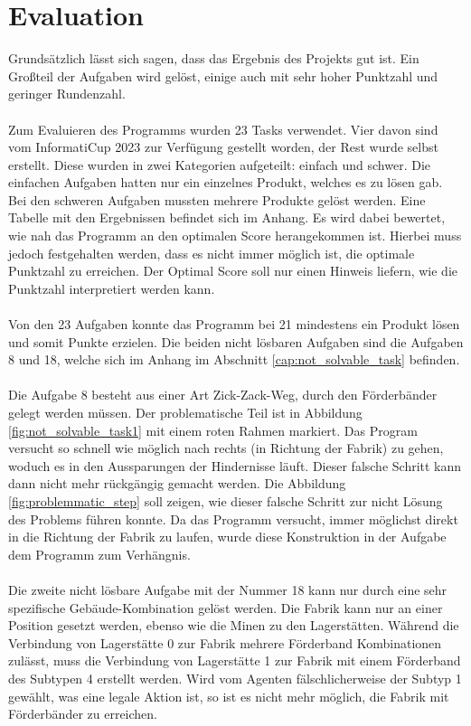 \section{Evaluation}\label{cap:evaluation}
Grundsätzlich lässt sich sagen, dass das Ergebnis des Projekts gut ist. Ein Großteil der Aufgaben wird gelöst, einige auch mit sehr hoher Punktzahl und geringer Rundenzahl.
\\\\
Zum Evaluieren des Programms wurden 23 Tasks verwendet. Vier davon sind vom InformatiCup 2023 zur Verfügung gestellt worden, der Rest wurde selbst erstellt. Diese wurden in zwei Kategorien aufgeteilt: einfach und schwer. Die einfachen Aufgaben hatten nur ein einzelnes Produkt, welches es zu lösen gab. Bei den schweren Aufgaben mussten mehrere Produkte gelöst werden. Eine Tabelle mit den Ergebnissen befindet sich im Anhang. Es wird dabei bewertet, wie nah das Programm an den optimalen Score herangekommen ist. Hierbei muss jedoch festgehalten werden, dass es nicht immer möglich ist, die optimale Punktzahl zu erreichen. Der Optimal Score soll nur einen Hinweis liefern, wie die Punktzahl interpretiert werden kann. 
\\\\
Von den 23 Aufgaben konnte das Programm bei 21 mindestens ein Produkt lösen und somit Punkte erzielen. Die beiden nicht lösbaren Aufgaben sind die Aufgaben 8 und 18, welche sich im Anhang im Abschnitt \ref{cap:not_solvable_task} befinden.
\\\\
Die Aufgabe 8 besteht aus einer Art Zick-Zack-Weg, durch den Förderbänder gelegt werden müssen. Der problematische Teil ist in Abbildung \ref{fig:not_solvable_task1} mit einem roten Rahmen markiert. Das Program versucht so schnell wie möglich nach rechts (in Richtung der Fabrik) zu gehen, woduch es in den Aussparungen der Hindernisse läuft. Dieser falsche Schritt kann dann nicht mehr rückgängig gemacht werden. Die Abbildung \ref{fig:problemmatic_step} soll zeigen, wie dieser falsche Schritt zur nicht Lösung des Problems führen konnte.
Da das Programm versucht, immer möglichst direkt in die Richtung der Fabrik zu laufen, wurde diese Konstruktion in der Aufgabe dem Programm zum Verhängnis.
\\\\
Die zweite nicht lösbare Aufgabe mit der Nummer 18 kann nur durch eine sehr spezifische Gebäude-Kombination gelöst werden. Die Fabrik kann nur an einer Position gesetzt werden, ebenso wie die Minen zu den Lagerstätten. Während die Verbindung von Lagerstätte 0 zur Fabrik mehrere Förderband Kombinationen zulässt, muss die Verbindung von Lagerstätte 1 zur Fabrik mit einem Förderband des Subtypen 4 erstellt werden. Wird vom Agenten fälschlicherweise der Subtyp 1 gewählt, was eine legale Aktion ist, so ist es nicht mehr möglich, die Fabrik mit Förderbänder zu erreichen. \\
